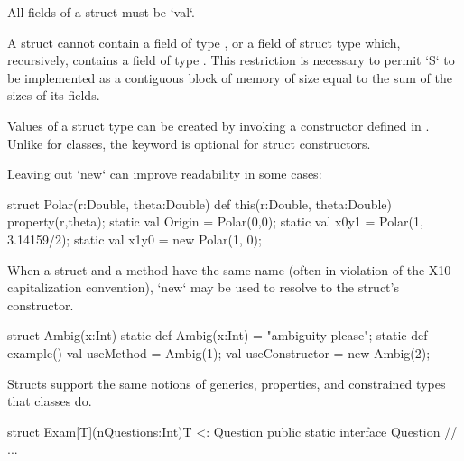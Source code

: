 All fields of a struct must be \xcd`val`.

A struct  cannot contain a field of type , or a field of struct
type  which, recursively, contains a field of type .  This
restriction is necessary to permit \xcd`S` to be implemented as a contiguous
block of memory of size equal to the sum of the sizes of its fields.  


Values of a struct  type can be created by invoking a constructor
defined in .  Unlike for classes, the   keyword is optional
for struct constructors.  

\begin{ex}
Leaving out \xcd`new` can improve readability in some cases: 
\begin{xten}
struct Polar(r:Double, theta:Double){
  def this(r:Double, theta:Double) {property(r,theta);}
  static val Origin = Polar(0,0);
  static val x0y1   = Polar(1, 3.14159/2);
  static val x1y0   = new Polar(1, 0); 
}
\end{xten}
%


When a struct and a method have the same name (often in violation of the X10
capitalization convention), 
\xcd`new` may be used to resolve to the struct's constructor.  
\begin{xten}
struct Ambig(x:Int) {
  static def Ambig(x:Int) = "ambiguity please";
  static def example() { 
    val useMethod      = Ambig(1);
    val useConstructor = new Ambig(2);
  }
}
\end{xten}
%

\end{ex}

Structs support the same notions of generics, properties, and constrained
types that classes do.  

\begin{ex}

\begin{xten}
struct Exam[T](nQuestions:Int){T <: Question} {
  public static interface Question {}
  // ... 
}
\end{xten}
%


\end{ex}


